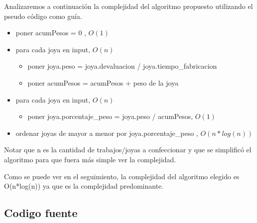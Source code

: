 Analizaremos a continuaci\'on la complejidad del algoritmo propuesto utilizando el pseudo c\'odigo como gu\'ia.

\begin{itemize}
\item poner acumPesos = 0 , $O(1)$
\item para cada  joya en input, $O(n)$
\begin{itemize}
\item poner joya.peso = joya.devaluacion / joya.tiempo\_fabricacion
\item poner acumPesos = acumPesos + peso de la joya
\end{itemize}
	
\item para cada joya en input, $O(n)$
\begin{itemize}
	\item poner joya.porcentaje\_peso = joya.peso / acumPesos, $O(1)$
\end{itemize}

\item ordenar joyas de mayor a menor por joya.porcentaje\_peso , $O(n*log(n))$
\end{itemize}



Notar que n es la cantidad de trabajos/joyas a confeccionar y que se simplific\'o el algoritmo para que fuera m\'as simple ver la complejidad.

Como se puede ver en el seguimiento, la complejidad del algoritmo elegido es O(n*log(n)) ya que es la complejidad predominante.\\

\newpage

\subsection{Codigo fuente}

